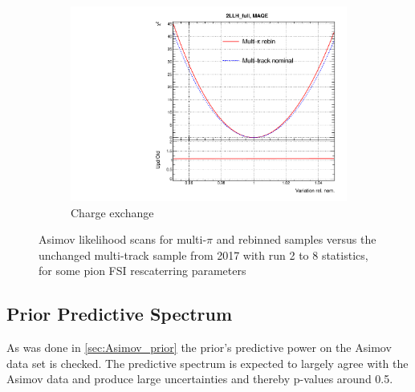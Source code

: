 \begin{figure}[h]
\begin{subfigure}[t]{0.32\textwidth}
		\includegraphics[width=\textwidth,page=11, trim={0mm 0mm 0mm 9mm}, clip]{figures/mach3/2018/llh/MultiPi_vs_MultiTrack_TotalLLH}
		\caption{Charge exchange}
	\end{subfigure}
	\caption{Asimov likelihood scans for multi-$\pi$ and rebinned samples versus the unchanged multi-track sample from 2017 with run 2 to 8 statistics, for some pion FSI rescaterring parameters}
	\label{fig:llh_multitrack_vs_multipi_fsi}
\end{figure}

\subsection{Prior Predictive Spectrum}
As was done in \autoref{sec:Asimov_prior} the prior's predictive power on the Asimov data set is checked. The predictive spectrum is expected to largely agree with the Asimov data and produce large uncertainties and thereby p-values around 0.5.

